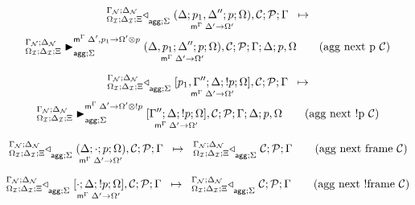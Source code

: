
\begin{multline}
\transx{
   \contstatea{\deltan}{\lframe{\Delta}{p_1, \Delta''}{p}{\Omega}{\Delta'}{\Omega'}, \lstack{C} ; \lstack{P}}{\Gamma}{\Sigma}
}
{
   \matstatea{\deltan}{\lframe{\Delta,
      p_1}{\Delta''}{p}{\Omega}{\Delta'}{\Omega'}, \lstack{C}; \lstack{P}}{\Gamma}{\Delta}{p,
      \Omega}{\Delta', p_1 \rightarrow \Omega' \otimes p}{\Sigma}
} \tag{agg next p $\lstack{C}$}
\end{multline}

\begin{multline}
\transx{
   \contstatea{\deltan}{\pframe{p_1, \Gamma''}{\Delta}{\bang
   p}{\Omega}{\Delta'}{\Omega'}, \lstack{C} ; \lstack{P}}{\Gamma}{\Sigma}
}
{
   \matstatea{\deltan}{\pframe{\Gamma''}{\Delta}{\bang p}
      {\Omega}{\Delta'}{\Omega'}, \lstack{C}; \lstack{P}}{\Gamma}{\Delta}{p,
      \Omega}{\Delta' \rightarrow \Omega' \otimes \bang p}{\Sigma}
} \tag{agg next \bang p $\lstack{C}$}
\end{multline}

\[
\trans{
   \contstatea{\deltan}{\lframe{\Delta}{\cdot}{p}{\Omega}{\Delta'}{\Omega'}, \lstack{C} ; \lstack{P}}{\Gamma}{\Sigma}
}
{
   \contstatea{\deltan}{\lstack{C} ; \lstack{P}}{\Gamma}{\Sigma}
} \tag{agg  next frame $\lstack{C}$}
\]

\[
\trans{
   \contstatea{\deltan}{\pframe{\cdot}{\Delta}{\bang
   p}{\Omega}{\Delta'}{\Omega'}, \lstack{C} ; \lstack{P}}{\Gamma}{\Sigma}
}
{
   \contstatea{\deltan}{\lstack{C} ; \lstack{P}}{\Gamma}{\Sigma}
} \tag{agg next \bang frame $\lstack{C}$}
\]
